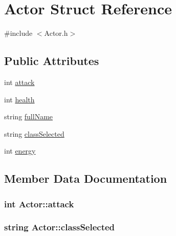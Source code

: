 \hypertarget{struct_actor}{}\section{Actor Struct Reference}
\label{struct_actor}


{\ttfamily \#include $<$Actor.\+h$>$}

\subsection*{Public Attributes}
\begin{DoxyCompactItemize}
\item 
int \hyperlink{struct_actor_a5e634d4da03f27502b3acd6babb6c94b}{attack}
\item 
int \hyperlink{struct_actor_a6932c660e6b6293a66b393c3c9cb151a}{health}
\item 
string \hyperlink{struct_actor_a2cadac890a05336b48e5b247901f5b08}{full\+Name}
\item 
string \hyperlink{struct_actor_a7950bfa41c5bb7a4ae04c925f800271e}{class\+Selected}
\item 
int \hyperlink{struct_actor_ab3bf461c752924b24b2b9a81250e5274}{energy}
\end{DoxyCompactItemize}


\subsection{Member Data Documentation}
\hypertarget{struct_actor_a5e634d4da03f27502b3acd6babb6c94b}{}
\subsubsection[{attack}]{\setlength{\rightskip}{0pt plus 5cm}int Actor\+::attack}\label{struct_actor_a5e634d4da03f27502b3acd6babb6c94b}
\hypertarget{struct_actor_a7950bfa41c5bb7a4ae04c925f800271e}{}
\subsubsection[{class\+Selected}]{\setlength{\rightskip}{0pt plus 5cm}string Actor\+::class\+Selected}\label{struct_actor_a7950bfa41c5bb7a4ae04c925f800271e}
\hypertarget{struct_actor_ab3bf461c752924b24b2b9a81250e5274}{}
